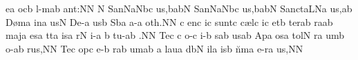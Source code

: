 \sgn {}e{}\punctum a\egn
\spatium
{}oc\punctum b\egn
\sgn l{\a}{-m}\punctum a\augmentum b\egn
\sgn {}a{nt:}\punctum N\augmentum N\egn
\spatium
\divisiofinalis
\spatium
\custos N
\lineaproxima
\sgn Sa{n}\pes Na\augmentum N\nonspatium\hskip-3pt\quilismapes bc\egn
{}u{s,}\clivis ba\augmentumduplex bN\egn
\spatium
\divisiofinalis
\spatium
\sgn Sa{n}\pes Na\augmentum N\nonspatium\hskip-3pt\quilismapes bc\egn
{}u{s,}\clivis ba\augmentumduplex bN\egn
\spatium
\divisiofinalis
\spatium
\sgn Sa{nct}\clivis aL\spatiumparvum\pes Na\egn
\sgn {}u{s,}\punctum a\augmentum b\egn
\spatium
\divisiominor
\spatium
\sgn D{\o}m\punctum a\egn
\sgn {}in\punctum a\egn
\sgn {}us\punctum N\egn
\spatium\sgn De-\punctum a\egn
\sgn {}us\punctum b\egn
\spatium
\sgn S{\a}b\punctum a\egn
\sgn {}a-\punctum a\egn
\sgn {}o{th.}\punctum N\augmentum N\egn
\spatium
\divisiofinalis
\spatium
\custos c
\lineaproxima
{}en\punctum c\egn
\sgn {}i{}\punctum c\egn
\spatium
\sgn su{nt}\punctum c\egn
\spatium\sgn c{\ae}l\punctum c\egn
\sgn {}i{}\punctum c\egn
\spatium\sgn {}et\punctum b\egn
\spatium
\sgn ter\pes ab\egn
\sgn ra{}\punctum a\augmentum b\egn
\spatium
\divisiominor
\spatium
\sgn maj\punctum a\egn
\sgn {}es\punctum a\egn
\sgn t{\a}t\punctum a\egn
\sgn {}is\punctum a\egn
\spatium
{}r\punctum N\egn
\sgn {}i-\punctum a\egn
\sgn {}{\ae}{}\punctum b\egn
\spatium
\sgn tu-\engl{}\punctum a\augmentum b\egn
\sgn {}{\ae}.\punctum N\augmentum N\egn
\spatium\divisiofinalis\spatium
\sgn Te{}\punctum c\egn
\spatium
\custos c
\lineaproxima
{}o-\punctum c\egn
{}i-\punctum b\egn
\sgn {}{\o}s\pes ab\egn
\sgn {}us\punctum a\augmentum b\egn
\spatium
\divisiominor
\spatium
\sgn {}Ap\punctum a\egn
\sgn {}os\punctum a\egn
\sgn tol\punctum N\egn
\sgn {}{\o}r\punctum a\egn
\sgn {}um\punctum b\egn
\spatium
{}o-\punctum a\augmentum b\egn
\sgn ru{s,}\punctum N\augmentum N\egn
\spatium
\divisiofinalis
\spatium
\sgn Te{}\punctum c\egn
\spatium
{}op\punctum c\egn
{}e-\punctum b\egn
{}r\pes ab\egn
\sgn {}um\punctum a\augmentum b\egn
\spatium
\divisiominor
\spatium
\custos a
\lineaproxima
\sgn lau\punctum a\egn
\sgn d{\a}{b}\punctum N\egn
\sgn {}il\punctum a\egn
\sgn {}is\punctum b\egn
\spatium
\sgn n{\u}m\punctum a\egn
\sgn {}e{-r}\punctum a\egn
\sgn {}u{s,}\punctum N\augmentum N\egn
\spatium
\divisiofinalis
